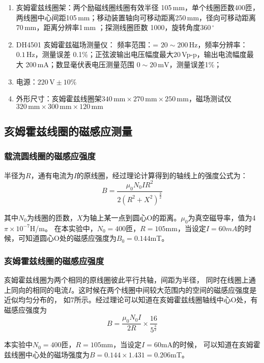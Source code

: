 \documentclass[11pt]{article}
\begin{document}
	\begin{enumerate}
		\item 亥姆霍兹线圈架：两个励磁线圈线圈有效半径 105\,mm，单个线圈匝数400匝，两线圈中心间距105\,mm；移动装置轴向可移动距离250\,mm，径向可移动距离70\,mm，距离分辨率1\,mm ；探测线圈匝数 1000，旋转角度$ 360\,^\circ $
		\item DH4501 亥姆霍兹磁场测量仪： 频率范围：= $ 20\sim 200\,\mathrm{Hz} $，频率分辨率：$ 0.1\,\mathrm{Hz} $，测量误差 0.1\%；正弦波输出电压幅度最大$ 20\, $Vp-p，输出电流幅度最大 200\,mA；数显毫伏表电压测量范围 $ 0\sim 20\,\mathrm{mV} $，测量误差1\%；
		\item 电源：$ 220\,\mathrm V\pm 10\% $
		\item 外形尺寸：亥姆霍兹线圈架$ 340\,\mathrm{mm}\times270\,\mathrm{mm}\times250\,\mathrm{mm} $，磁场测试仪$ 320\,\mathrm{mm}\times300\,\mathrm{mm}\times120\,\mathrm{mm} $
	\end{enumerate}	
	
	\subsection{亥姆霍兹线圈的磁感应测量}
	\subsubsection{载流圆线圈的磁感应强度}
	半径为$R$，通有电流为$I$的原线圈，经过理论计算得到的轴线上的强度公式为：
	\begin{equation*}
		B=\frac{\mu_0N_0IR^2}{2(R^2+X^2)^{\frac{3}{2}}}
	\end{equation*}
	
	其中$N_0$为线圈的匝数，$X$为轴上某一点到圆心O的距离。$\mu_0$为真空磁导率，值为4$\pi\times10^{-7}$H/m。
	在本实验中，$N_0=400$匝，$R=105$mm，当设定$I=60mA$的时候，可知道圆心O处的磁感应强度为$B_0=0.144$mT。
	
	\subsubsection{亥姆霍兹线圈的磁感应强度}
	亥姆霍兹线圈为两个相同的原线圈彼此平行共轴，间距为半径，
	同时在线圈上通上同向的相同的电流$I$。这时候在两个线圈中间较大范围内的空间的磁感应强度是近似均匀分布的，
	如\figurename7所示。经过理论可以知道在亥姆霍兹线圈轴线中心O处，有磁感应强度为
	\begin{equation*}
		B=\frac{\mu_0N_0I}{2R}\times\frac{16}{5^{\frac{3}{2}}}
	\end{equation*}
	
	本实验中$N_0=400$匝，$R=105$mm，当设定$I=60$mA的时候，
	可以知道在亥姆霍兹线圈中心处的磁场强度为$B=0.144\times1.431=0.206$mT。
	
\end{document}
